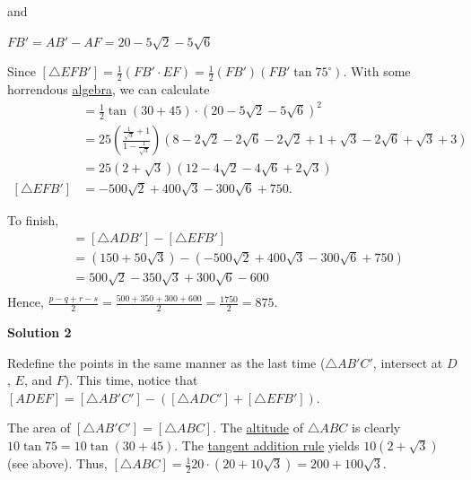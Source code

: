 \begin{enumerate}
 and

 $FB' = AB' - AF = 20 - 5\sqrt{2} - 5\sqrt{6}$

 Since $[\triangle EFB'] = \frac{1}{2} (FB' \cdot EF) = \frac{1}{2} (FB') (FB' \tan 75^{\circ})$. With some horrendous \href{https://artofproblemsolving.com/wiki/index.php?title=Algebra}{algebra}, we can calculate
 \begin{align*} [\triangle EFB'] &= \frac{1}{2}\tan (30 + 45) \cdot (20 - 5\sqrt{2} - 5\sqrt{6})^2 \\ &= 25 \left(\frac{\frac{1}{\sqrt{3}} + 1}{1 - \frac{1}{\sqrt{3}}}\right) \left(8 - 2\sqrt{2} - 2\sqrt{6} - 2\sqrt{2} + 1 + \sqrt{3} - 2\sqrt{6} + \sqrt{3} + 3\right) \\ &= 25(2 + \sqrt{3})(12 - 4\sqrt{2} - 4\sqrt{6} + 2\sqrt{3}) \\ [\triangle EFB'] &= \boxed{- 500\sqrt{2} + 400\sqrt{3} - 300\sqrt{6} +750}. \end{align*}


 To finish,
 \begin{align*} [ADEF] &= [\triangle ADB'] - [\triangle EFB']\\        &= \left(150 + 50\sqrt{3}\right) - \left(-500\sqrt{2} + 400\sqrt{3} - 300\sqrt{6} + 750\right)\\        &=500\sqrt{2} - 350\sqrt{3} + 300\sqrt{6} - 600\\ \end{align*}
Hence, $\frac{p-q+r-s}{2} = \frac{500 + 350 + 300 + 600}2 = \frac{1750}2 = \boxed{\boxed{875}}$.

 



\textbf{Solution 2}

Redefine the points in the same manner as the last time ($\triangle AB'C'$, intersect at $D$, $E$, and $F$). This time, notice that $[ADEF] = [\triangle AB'C'] - ([\triangle ADC'] + [\triangle EFB'])$.

 The area of $[\triangle AB'C'] = [\triangle ABC]$. The \href{https://artofproblemsolving.com/wiki/index.php?title=Altitude}{altitude} of $\triangle ABC$ is clearly $10 \tan 75 = 10 \tan (30 + 45)$. The \href{https://artofproblemsolving.com/wiki/index.php/Trigonometric\_identities\#Angle\_addition\_identities}{tangent addition rule} yields $10(2 + \sqrt{3})$ (see above). Thus, $[\triangle ABC] = \frac{1}{2} 20 \cdot (20 + 10\sqrt{3}) = 200 + 100\sqrt{3}$. 


\end{enumerate}
